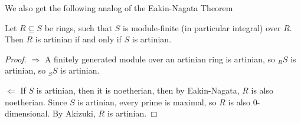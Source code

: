  We also get the following analog of the Eakin-Nagata Theorem
 \begin{corollary}
   Let $R\subseteq S$ be rings, such that $S$ is module-finite (in particular integral)
   over $R$. Then $R$ is artinian if and only if $S$ is artinian.
 \end{corollary}
 \begin{proof}
   $\Rightarrow$ A finitely generated module over an artinian ring is artinian, so ${}_R
   S$ is artinian, so ${}_S S$ is artinian.

   $\Leftarrow$ If $S$ is artinian, then it is noetherian, then by Eakin-Nagata, $R$ is
   also noetherian. Since $S$ is artinian, every prime is maximal, so $R$ is also
   0-dimensional. By Akizuki, $R$ is artinian.
 \end{proof}

